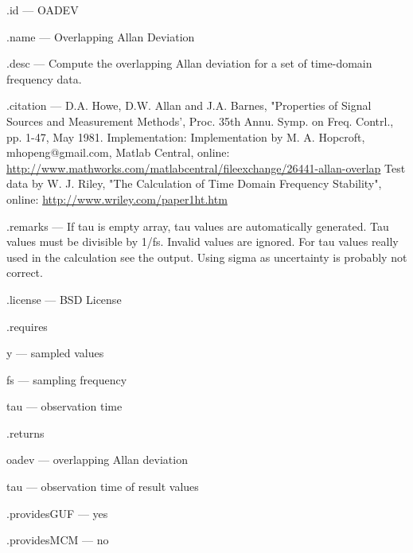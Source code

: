\begin{tightdesc}
\item [\textsf{.id}] --- OADEV
\item [\textsf{.name}] --- Overlapping Allan Deviation
\item [\textsf{.desc}] --- Compute the overlapping Allan deviation for a set of time-domain frequency data.
\item [\textsf{.citation}] --- D.A. Howe, D.W. Allan and J.A. Barnes, "Properties of Signal Sources and Measurement Methods', Proc. 35th Annu. Symp. on Freq. Contrl., pp. 1-47, May 1981. Implementation: Implementation by M. A. Hopcroft, mhopeng@gmail.com, Matlab Central, online: \url{http://www.mathworks.com/matlabcentral/fileexchange/26441-allan-overlap} Test data by W. J. Riley, "The Calculation of Time Domain Frequency Stability", online: \url{http://www.wriley.com/paper1ht.htm}
\item [\textsf{.remarks}] --- If tau is empty array, tau values are automatically generated. Tau values must be divisible by 1/fs. Invalid values are ignored. For tau values really used in the calculation see the output. Using sigma as uncertainty is probably not correct.
\item [\textsf{.license}] --- BSD License
\item [\textsf{.requires}] \rule{0em}{0em}
\begin{tightdesc}
\item [\textsf{y}] --- sampled values
\item [\textsf{fs}] --- sampling frequency
\item [\textsf{tau}] --- observation time
\end{tightdesc}
\item [\textsf{.returns}] \rule{0em}{0em}
\begin{tightdesc}
\item [\textsf{oadev}] --- overlapping Allan deviation
\item [\textsf{tau}] --- observation time of result values
\end{tightdesc}
\item [\textsf{.providesGUF}] --- yes
\item [\textsf{.providesMCM}] ---  no
\end{tightdesc}
